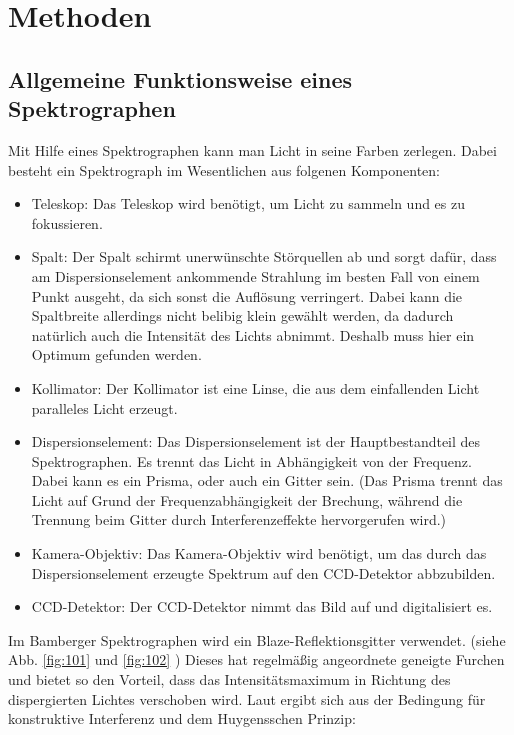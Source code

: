 \section{Methoden}

\subsection{Allgemeine Funktionsweise eines Spektrographen}
Mit Hilfe eines Spektrographen kann man Licht in seine Farben zerlegen. Dabei besteht ein Spektrograph im Wesentlichen aus folgenen Komponenten:

\begin{itemize}

\item Teleskop: Das Teleskop wird benötigt, um Licht zu sammeln und es zu fokussieren.

\item Spalt: Der Spalt schirmt unerwünschte Störquellen ab und sorgt dafür, dass am Dispersionselement ankommende Strahlung im besten Fall von einem Punkt ausgeht, da sich sonst die Auflösung verringert. Dabei kann die Spaltbreite allerdings nicht belibig klein gewählt  werden, da dadurch natürlich auch die Intensität des Lichts abnimmt. Deshalb muss hier ein Optimum gefunden werden.

\item Kollimator: Der Kollimator ist eine Linse, die aus dem einfallenden Licht paralleles Licht erzeugt.

\item Dispersionselement: Das Dispersionselement ist der Hauptbestandteil des Spektrographen. Es trennt das Licht in Abhängigkeit von der Frequenz. Dabei kann es ein Prisma, oder auch ein Gitter sein. (Das Prisma trennt das Licht auf Grund der Frequenzabhängigkeit der Brechung, während die Trennung beim Gitter durch Interferenzeffekte hervorgerufen wird.)

\item Kamera-Objektiv: Das Kamera-Objektiv wird benötigt, um das durch das Dispersionselement erzeugte Spektrum auf den CCD-Detektor abbzubilden.

\item CCD-Detektor: Der CCD-Detektor nimmt das Bild auf und digitalisiert es.

\end{itemize}
Im Bamberger Spektrographen wird ein Blaze-Reflektionsgitter verwendet. (siehe Abb. \ref{fig:101} und \ref{fig:102} ) Dieses hat regelmäßig angeordnete geneigte Furchen und bietet so den Vorteil, dass das Intensitätsmaximum in Richtung des dispergierten Lichtes verschoben wird. Laut \cite{ronomischesPraktikum} ergibt sich aus der Bedingung für konstruktive Interferenz und dem Huygensschen Prinzip:

